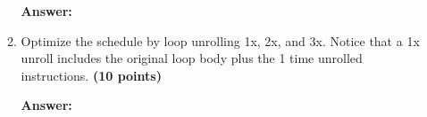 \documentclass[a4paper, 11pt]{exam}
\begin{document}
\begin{center}
\begin{enumerate}
\begin{enumerate}
	\hfill
 
\textbf{Answer:} 

\hfill
	
	\item Optimize the schedule by loop unrolling 1x, 2x, and 3x. Notice that a 1x unroll includes the original loop body plus the 1 time unrolled instructions. \textbf{(10 points)}
	
	\hfill
 
\textbf{Answer:} 

\hfill


\end{enumerate}




\end{enumerate}
\end{center}
\end{document}
